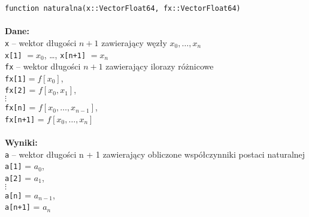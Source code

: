 \documentclass[a4paper]{article}
\newcommand\tab[1][1cm]{\hspace*{#1}}
\begin{document}
    \texttt{function naturalna(x::Vector{Float64}, fx::Vector{Float64})} \\\\
    \textbf{Dane:}\\
    \texttt{x} – wektor długości $n + 1$ zawierający węzły $x_0, \dots, x_n$ \\
    \tab \texttt{x[1]} $ = x_0$, \dots, \texttt{x[n+1]} $ = x_n$ \\
    \texttt{fx} – wektor długości $n + 1$ zawierający ilorazy różnicowe \\
    \tab \texttt{fx[1]}$ = f[x_0]$, \\
    \tab \texttt{fx[2]} = $f[x_0, x_1]$, \\
    \tab $\vdots$ \\
    \tab \texttt{fx[n]} = $f[x_0, \dots, x_{n-1}]$, \\
    \tab \texttt{fx[n+1]} = $f[x_0, \dots, x_n]$ \\\\
    \textbf{Wyniki:}\\
    \texttt{a} – wektor długości n + 1 zawierający obliczone współczynniki postaci naturalnej \\
    \tab \texttt{a[1]} = $a_0$, \\
    \tab \texttt{a[2]} = $a_1$, \\
    \tab $\vdots$ \\
    \tab \texttt{a[n]} = $a_{n-1}$, \\
    \tab \texttt{a[n+1]} = $a_n$ \\
\end{document}
